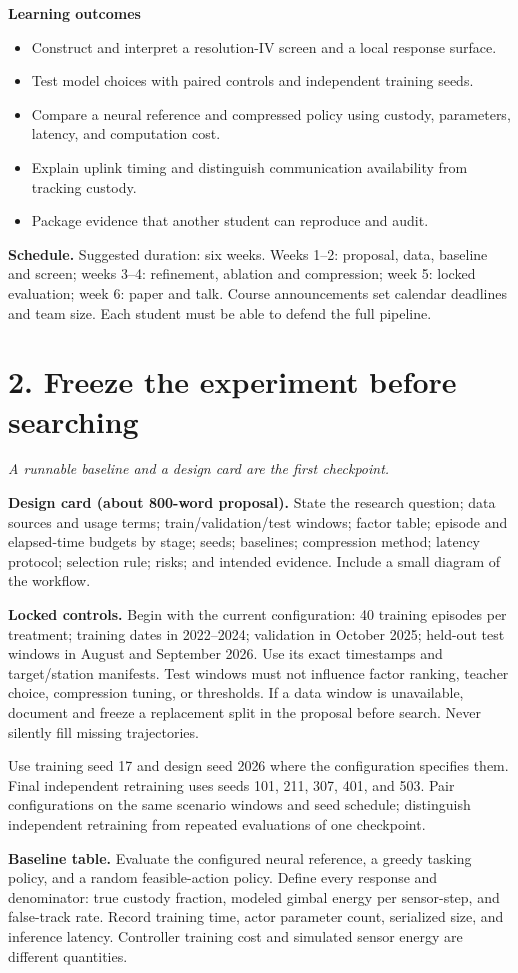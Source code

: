 \documentclass[11pt,letterpaper]{article}
\newcommand{\pageheading}[2]{\section*{\color{navy}#1}\textit{#2}\par}
\begin{document}
\textbf{Learning outcomes}
\begin{itemize}
\item Construct and interpret a resolution-IV screen and a local response surface.
\item Test model choices with paired controls and independent training seeds.
\item Compare a neural reference and compressed policy using custody, parameters, latency, and computation cost.
\item Explain uplink timing and distinguish communication availability from tracking custody.
\item Package evidence that another student can reproduce and audit.
\end{itemize}
\textbf{Schedule.} Suggested duration: six weeks. Weeks 1--2: proposal, data, baseline and screen; weeks 3--4: refinement, ablation and compression; week 5: locked evaluation; week 6: paper and talk. Course announcements set calendar deadlines and team size. Each student must be able to defend the full pipeline.

\newpage
\pageheading{2. Freeze the experiment before searching}{A runnable baseline and a design card are the first checkpoint.}
\textbf{Design card (about 800-word proposal).} State the research question; data sources and usage terms; train/validation/test windows; factor table; episode and elapsed-time budgets by stage; seeds; baselines; compression method; latency protocol; selection rule; risks; and intended evidence. Include a small diagram of the workflow.

\textbf{Locked controls.} Begin with the current configuration: 40 training episodes per treatment; training dates in 2022--2024; validation in October 2025; held-out test windows in August and September 2026. Use its exact timestamps and target/station manifests. Test windows must not influence factor ranking, teacher choice, compression tuning, or thresholds. If a data window is unavailable, document and freeze a replacement split in the proposal before search. Never silently fill missing trajectories.

Use training seed 17 and design seed 2026 where the configuration specifies them. Final independent retraining uses seeds 101, 211, 307, 401, and 503. Pair configurations on the same scenario windows and seed schedule; distinguish independent retraining from repeated evaluations of one checkpoint.

\textbf{Baseline table.} Evaluate the configured neural reference, a greedy tasking policy, and a random feasible-action policy. Define every response and denominator: true custody fraction, modeled gimbal energy per sensor-step, and false-track rate. Record training time, actor parameter count, serialized size, and inference latency. Controller training cost and simulated sensor energy are different quantities.
\end{document}
